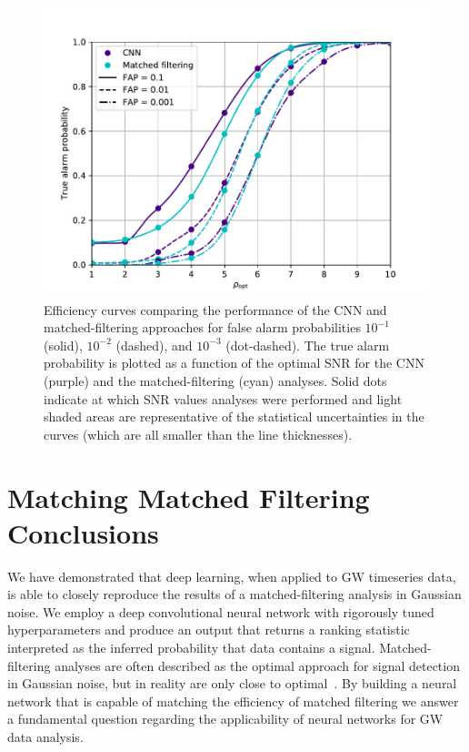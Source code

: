 %
%
\begin{figure}[]
\includegraphics[width=\columnwidth] {figures/efficiency.pdf}
\caption[Efficiency curves comparing the performance of the CNNs~ and matched-filtering approaches for false alarm probabilities $10^{-1}$ (solid), $10^{-2}$ (dashed), $10^{-3}$ (dot-dashed).]{Efficiency curves comparing the performance of the \ac{CNN} and matched-filtering approaches for false alarm probabilities $10^{-1}$ (solid), $10^{-2}$ (dashed), and $10^{-3}$ (dot-dashed). The true alarm probability is plotted as a function of the optimal \ac{SNR} for the \ac{CNN} (purple) and the
matched-filtering (cyan) analyses. Solid dots indicate at which \ac{SNR} values analyses were performed and light shaded areas are representative of 
the statistical uncertainties in the curves (which are all smaller than the 
line thicknesses).\label{fig:efficiency_curve}} 
\end{figure}

%
%
\section{Matching Matched Filtering Conclusions}\label{sec:mmf_conclusions} 
%
%
We have demonstrated that deep learning, when applied to \ac{GW}
timeseries data, is able to closely reproduce the results of a 
matched-filtering analysis in Gaussian noise. We employ a 
deep convolutional neural network with rigorously tuned 
hyperparameters and produce an output that returns a ranking 
statistic interpreted as the inferred probability that data contains a 
signal. Matched-filtering analyses are often described as 
the optimal approach for signal detection in Gaussian 
noise, but in reality are only close to
optimal~\cite{2008arXiv0804.1161S,2021arXiv210403961Y}. By building a 
neural network that is capable of matching the efficiency of matched 
filtering we answer a fundamental question regarding the applicability 
of neural networks for \ac{GW} data analysis. 

